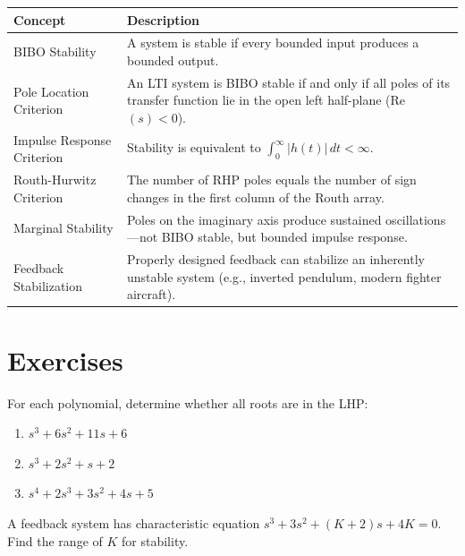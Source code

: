 \begin{conceptbox}
\begin{center}
\begin{tabular}{@{}p{3.8cm}p{9.5cm}@{}}
\toprule
\textbf{Concept} & \textbf{Description} \\
\midrule
BIBO Stability & A system is stable if every bounded input produces a bounded output. \\[0.5em]
Pole Location Criterion & An LTI system is BIBO stable if and only if all poles of its transfer function lie in the open left half-plane (Re$(s) < 0$). \\[0.5em]
Impulse Response Criterion & Stability is equivalent to $\int_0^\infty |h(t)| \, dt < \infty$. \\[0.5em]
Routh-Hurwitz Criterion & The number of RHP poles equals the number of sign changes in the first column of the Routh array. \\[0.5em]
Marginal Stability & Poles on the imaginary axis produce sustained oscillations---not BIBO stable, but bounded impulse response. \\[0.5em]
Feedback Stabilization & Properly designed feedback can stabilize an inherently unstable system (e.g., inverted pendulum, modern fighter aircraft). \\
\bottomrule
\end{tabular}
\end{center}
\end{conceptbox}

\newpage
\section{Exercises}

\begin{exercise}
For each polynomial, determine whether all roots are in the LHP:
\begin{enumerate}
\item $s^3 + 6s^2 + 11s + 6$
\item $s^3 + 2s^2 + s + 2$
\item $s^4 + 2s^3 + 3s^2 + 4s + 5$
\end{enumerate}
\end{exercise}

\begin{exercise}
A feedback system has characteristic equation $s^3 + 3s^2 + (K+2)s + 4K = 0$. Find the range of $K$ for stability.
\end{exercise}


